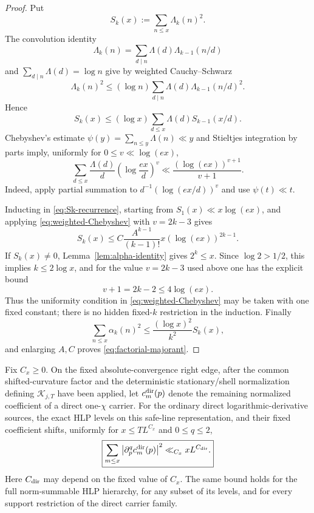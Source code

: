 \begin{proof}
Put
\[
S_k(x):=\sum_{n\le x}\Lambda_k(n)^2.
\]
The convolution identity
\[
\Lambda_k(n)=\sum_{d\mid n}\Lambda(d)\Lambda_{k-1}(n/d)
\]
and $\sum_{d\mid n}\Lambda(d)=\log n$ give by weighted Cauchy--Schwarz
\[
\Lambda_k(n)^2
\le(\log n)\sum_{d\mid n}\Lambda(d)\Lambda_{k-1}(n/d)^2.
\]
Hence
\begin{equation}
S_k(x)\le(\log x)\sum_{d\le x}\Lambda(d)S_{k-1}(x/d).
\label{eq:Sk-recurrence}
\end{equation}
Chebyshev's estimate $\psi(y)=\sum_{n\le y}\Lambda(n)\ll y$ and Stieltjes
integration by parts imply, uniformly for $0\le v\ll\log(ex)$,
\begin{equation}
\sum_{d\le x}\frac{\Lambda(d)}d
\left(\log\frac{ex}{d}\right)^v
\ll\frac{(\log(ex))^{v+1}}{v+1}.
\label{eq:weighted-Chebyshev}
\end{equation}
Indeed, apply partial summation to
$d^{-1}(\log(ex/d))^v$ and use $\psi(t)\ll t$.

Inducting in \eqref{eq:Sk-recurrence}, starting from
$S_1(x)\ll x\log(ex)$, and applying
\eqref{eq:weighted-Chebyshev} with $v=2k-3$ gives
\[
S_k(x)
\le C\frac{A^{k-1}}{(k-1)!}
 x(\log(ex))^{2k-1}.
\]
If $S_k(x)\ne0$, Lemma~\ref{lem:alpha-identity} gives $2^k\le x$. Since
$\log2>1/2$, this implies $k\le2\log x$, and for the value $v=2k-3$ used above
one has the explicit bound
\[
v+1=2k-2\le4\log(ex).
\]
Thus the uniformity condition in \eqref{eq:weighted-Chebyshev} may be taken
with one fixed constant; there is no hidden fixed-$k$ restriction in the
induction. Finally
\[
\sum_{n\le x}\alpha_k(n)^2
\le\frac{(\log x)^2}{k^2}S_k(x),
\]
and enlarging $A,C$ proves \eqref{eq:factorial-majorant}.
\end{proof}

\begin{lemma}
\label{lem:direct-carrier-square}
Fix $C_x\ge0$. On the fixed absolute-convergence right edge, after the common
shifted-curvature factor and the deterministic stationary/shell normalization
defining $\mathcal K_{j,T}$ have been applied, let $c_m^{\rm dir}(p)$ denote the
remaining normalized coefficient of a direct one-$\chi$ carrier. For the
ordinary direct logarithmic-derivative sources, the exact HLP levels on this
safe-line representation, and their fixed coefficient shifts, uniformly for
$x\le T L^{C_x}$ and $0\le q\le2$,
\begin{equation}
\boxed{
\sum_{m\le x}
\left|\partial_p^q c_m^{\rm dir}(p)\right|^2
\ll_{C_x} xL^{C_{\rm dir}}.
}
\label{eq:direct-carrier-square}
\end{equation}
Here $C_{\rm dir}$ may depend on the fixed value of $C_x$. The same bound holds
for the full norm-summable HLP hierarchy, for any subset of its levels, and for
every support restriction of the direct carrier family.
\end{lemma}

